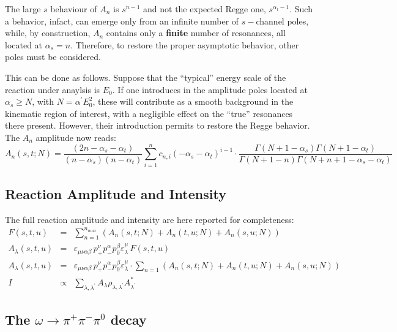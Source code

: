 \documentclass[a4paper,10pt]{report}
\newcommand{\decay}{$\omega \rightarrow \pi^+ \pi^- \pi^0$ }
\begin{document}
The large $s$ behaviour of $A_{n}$ is $s^{n-1}$ and not the expected Regge one, $s^{\alpha_t-1}$. Such a behavior, infact, can emerge only from an infinite number of $s-$channel poles,
while, by construction, $A_{n}$ contains only a \textbf{finite} number of resonances, all located at $\alpha_s=n$. 
Therefore, to restore the proper asymptotic behavior, other poles must be considered. 

This can be done as follows.  Suppose that the ``typical'' energy scale of the reaction under anaylsis is $E_0$. If one introduces in the amplitude poles located at $\alpha_s \geq N$, 
with $N=\alpha^{\prime}E^2_0$, these will contribute as a smooth background in the kinematic region of interest, with a negligible effect on the ``true'' resonances there present.
However, their introduction permits to restore the Regge behavior. The $A_n$ amplitude now reads:
\begin{equation}
A_{n}(s,t;N)=\frac{(2n-\alpha_s-\alpha_t)}{(n-\alpha_s)(n-\alpha_t)}\sum_{i=1}^n c_{n,i} (-\alpha_s-\alpha_t)^{i-1}
\cdot
\frac{\Gamma(N+1-\alpha_s)\Gamma(N+1-\alpha_t)}{\Gamma(N+1-n)\Gamma(N+n+1-\alpha_s-\alpha_t)}
\end{equation}

\subsection{Reaction Amplitude and Intensity}\label{sec:intensity}

The full reaction amplitude and intensity are here reported for completeness:
\begin{eqnarray}\label{eq:fullampl}
F(s,t,u) & = & \sum_{n=1}^{n_{max}}(A_{n}(s,t;N)+A_{n}(t,u;N)+A_{n}(s,u;N))
\\
A_\lambda(s,t,u) & = & \varepsilon_{\mu \nu \alpha \beta}\, p^{\nu}_{+}p^{\alpha}_{-}p^{\beta}_{0}\varepsilon^{\mu}_{\lambda} \, F(s,t,u) 
\\
A_\lambda(s,t,u) & = &
\varepsilon_{\mu \nu \alpha \beta}\, p^{\nu}_{+}p^{\alpha}_{-}p^{\beta}_{0}\varepsilon^{\mu}_{\lambda}
\cdot
\sum_{n=1}(A_{n}(s,t;N)+A_{n}(t,u;N)+A_{n}(s,u;N)) \\
I &\propto& \sum_{\lambda,\lambda^\prime} A_\lambda \rho_{\lambda,\lambda^\prime} A^*_{\lambda^\prime}
\end{eqnarray}

\subsection{The \decay decay}
\end{document}
